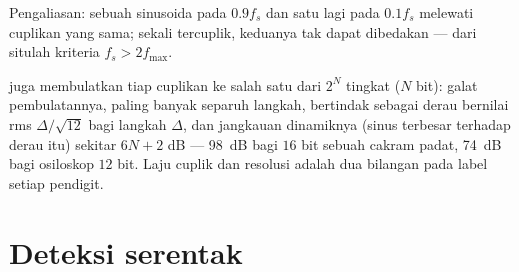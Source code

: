 \begin{omfigure}

{\small Pengaliasan: sebuah sinusoida pada $0.9f_s$ dan satu lagi pada $0.1f_s$ melewati
cuplikan yang sama; sekali tercuplik, keduanya tak dapat dibedakan --- dari situlah
kriteria $f_s > 2f_{\max}$.}
\end{omfigure}

\begin{remark}[Kuantisasi]\label{rem:b2:feedback-oscillators:quantization}
 juga membulatkan tiap cuplikan ke salah satu dari
$2^N$ tingkat ($N$ bit): galat pembulatannya, paling banyak separuh langkah, bertindak
sebagai derau bernilai rms $\Delta/\sqrt{12}$ bagi langkah $\Delta$, dan
jangkauan dinamiknya (sinus terbesar terhadap derau itu) sekitar $6N + 2$ dB ---
\qty{98}{dB} bagi $16$ bit sebuah cakram padat, \qty{74}{dB} bagi osiloskop
$12$ bit. Laju cuplik dan resolusi adalah dua bilangan pada
label setiap pendigit.
\end{remark}

\section{Deteksi serentak}

